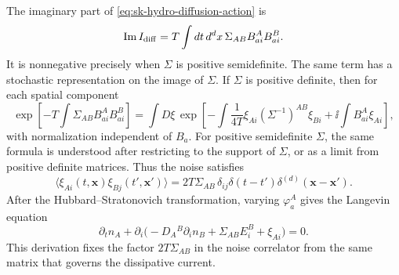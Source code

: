 The imaginary part of \eqref{eq:sk-hydro-diffusion-action} is
\begin{equation}
  \operatorname{Im} I_{\rm diff}
  =
  T\int dt\,d^dx\,\Sigma_{AB}B^A_{ai}B^B_{ai}.
  \label{eq:sk-hydro-imaginary-action}
\end{equation}
It is nonnegative precisely when \(\Sigma\) is positive semidefinite.  The
same term has a stochastic representation on the image of \(\Sigma\).  If
\(\Sigma\) is positive definite, then for each spatial component
\begin{equation}
  \exp\!\left[
    -T\int\Sigma_{AB}B^A_{ai}B^B_{ai}
  \right]
  =
  \int D\xi\,
  \exp\!\left[
    -\int\frac{1}{4T}
      \xi_{Ai}(\Sigma^{-1})^{AB}\xi_{Bi}
    +\ii\int B^A_{ai}\xi_{Ai}
  \right],
  \label{eq:sk-hydro-hubbard-stratonovich}
\end{equation}
with normalization independent of \(B_a\).  For positive semidefinite
\(\Sigma\), the same formula is understood after restricting to the support
of \(\Sigma\), or as a limit from positive definite matrices.  Thus the
noise satisfies
\begin{equation}
  \langle \xi_{Ai}(t,\mathbf x)\xi_{Bj}(t',\mathbf x')\rangle
  =
  2T\Sigma_{AB}\,\delta_{ij}
  \delta(t-t')\delta^{(d)}(\mathbf x-\mathbf x').
  \label{eq:sk-hydro-noise-correlator}
\end{equation}
After the Hubbard--Stratonovich transformation, varying \(\varphi^A_a\) gives
the Langevin equation
\begin{equation}
  \partial_t n_A+
  \partial_i\bigl(-D_A{}^B\partial_i n_B+\Sigma_{AB}E^B_i+\xi_{Ai}\bigr)=0 .
  \label{eq:sk-hydro-langevin-diffusion}
\end{equation}
This derivation fixes the factor \(2T\Sigma_{AB}\) in the noise correlator
from the same matrix that governs the dissipative current.

